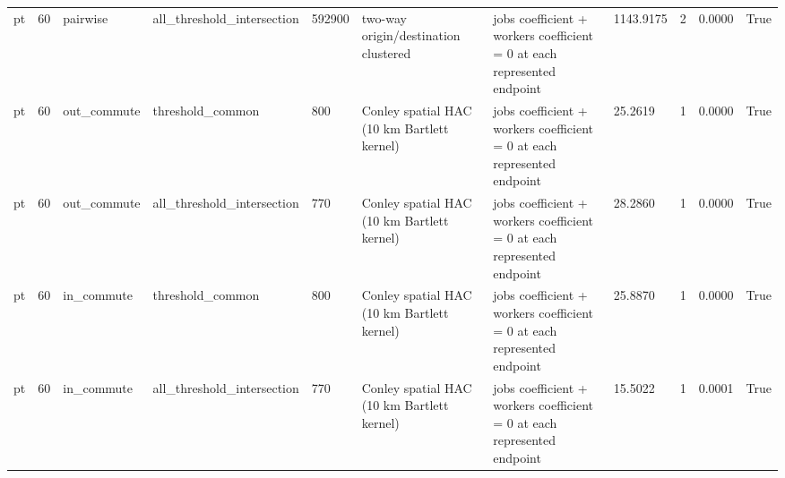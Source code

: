\begin{table}[htbp]
\begin{tabular}{lllllllllll}
pt & 60 & pairwise & all\_threshold\_intersection & 592900 & two-way origin/destination clustered & jobs coefficient + workers coefficient = 0 at each represented endpoint & 1143.9175 & 2 & 0.0000 & True \\
pt & 60 & out\_commute & threshold\_common & 800 & Conley spatial HAC (10 km Bartlett kernel) & jobs coefficient + workers coefficient = 0 at each represented endpoint & 25.2619 & 1 & 0.0000 & True \\
pt & 60 & out\_commute & all\_threshold\_intersection & 770 & Conley spatial HAC (10 km Bartlett kernel) & jobs coefficient + workers coefficient = 0 at each represented endpoint & 28.2860 & 1 & 0.0000 & True \\
pt & 60 & in\_commute & threshold\_common & 800 & Conley spatial HAC (10 km Bartlett kernel) & jobs coefficient + workers coefficient = 0 at each represented endpoint & 25.8870 & 1 & 0.0000 & True \\
pt & 60 & in\_commute & all\_threshold\_intersection & 770 & Conley spatial HAC (10 km Bartlett kernel) & jobs coefficient + workers coefficient = 0 at each represented endpoint & 15.5022 & 1 & 0.0001 & True \\
\bottomrule
\end{tabular}
\end{table}
